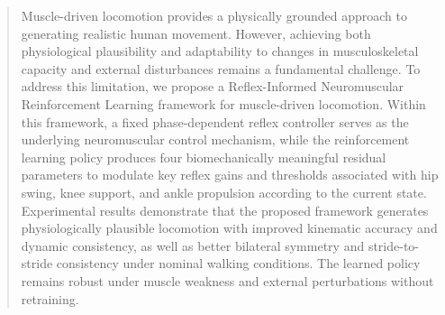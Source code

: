 \documentclass[manuscript,screen,review,anonymous]{acmart}
\begin{document}
\begin{abstract}

Muscle-driven locomotion provides a physically grounded approach to generating realistic human movement. However, achieving both physiological plausibility and adaptability to changes in musculoskeletal capacity and external disturbances remains a fundamental challenge. To address this limitation, we propose a Reflex-Informed Neuromuscular Reinforcement Learning framework for muscle-driven locomotion. Within this framework, a fixed phase-dependent reflex controller serves as the underlying neuromuscular control mechanism, while the reinforcement learning policy produces four biomechanically meaningful residual parameters to modulate key reflex gains and thresholds associated with hip swing, knee support, and ankle propulsion according to the current state. Experimental results demonstrate that the proposed framework generates physiologically plausible locomotion with improved kinematic accuracy and dynamic consistency, as well as better bilateral symmetry and stride-to-stride consistency under nominal walking conditions. The learned policy remains robust under muscle weakness and external perturbations without retraining.

\end{abstract}
\end{document}
